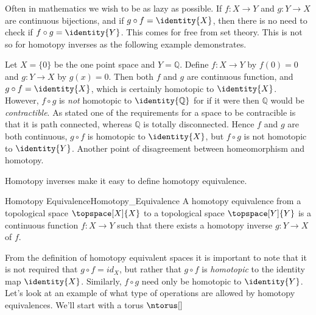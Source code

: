 \documentclass{book}                                                           %
\begin{document}
                Often in mathematics we wish to be as lazy as possible. If
                $f:X\rightarrow{Y}$ and $g:Y\rightarrow{X}$ are continuous
                bijections, and if $g\circ{f}=\identity{X}$, then there is no
                need to check if $f\circ{g}=\identity{Y}$. This comes for free
                from set theory. This is not so for homotopy inverses as the
                following example demonstrates.
                \begin{example}
                    Let $X=\{0\}$ be the one point space and $Y=\mathbb{Q}$.
                    Define $f:X\rightarrow{Y}$ by $f(0)=0$ and
                    $g:Y\rightarrow{X}$ by $g(x)=0$. Then both $f$ and $g$ are
                    continuous function, and $g\circ{f}=\identity{X}$, which is
                    certainly homotopic to $\identity{X}$. However, $f\circ{g}$
                    is \textit{not} homotopic to $\identity{\mathbb{Q}}$ for if
                    it were then $\mathbb{Q}$ would be \textit{contractible}. As
                    stated one of the requirements for a space to be contracible
                    is that it is path connected, whereas $\mathbb{Q}$ is
                    totally disconnected. Hence $f$ and $g$ are both continuous,
                    $g\circ{f}$ is homotopic to $\identity{X}$, but
                    $f\circ{g}$ is not homotopic to $\identity{Y}$. Another
                    point of disagreement between homeomorphism and homotopy.
                \end{example}
                Homotopy inverses make it easy to define homotopy equivalence.
                \begin{fdefinition}{Homotopy Equivalence}{Homotopy_Equivalence}
                    A homotopy equivalence from a topological space
                    $\topspace[X]{X}$ to a topological space $\topspace[Y]{Y}$
                    is a continuous function $f:X\rightarrow{Y}$ such that there
                    exists a homotopy inverse $g:Y\rightarrow{X}$ of $f$.
                \end{fdefinition}
                From the definition of homotopy equivalent spaces it is
                important to note that it is not required that
                $g\circ{f}=id_{X}$, but rather that $g\circ{f}$ is
                \textit{homotopic} to the identity map $\identity{X}$.
                Similarly, $f\circ{g}$ need only be homotopic to $\identity{Y}$.
                Let's look at an example of what type of operations are allowed
                by homotopy equivalences. We'll start with a torus $\ntorus[]$
\end{document}
